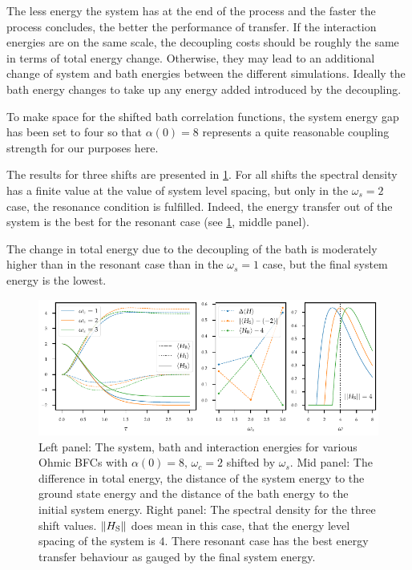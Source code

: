 The less energy the system has at the end of the process and the
faster the process concludes, the better the performance of
transfer. If the interaction energies are on the same scale, the
decoupling costs should be roughly the same in terms of total energy
change. Otherwise, they may lead to an additional change of system and
bath energies between the different simulations. Ideally the bath
energy changes to take up any energy added introduced by the
decoupling.

To make space for the shifted bath correlation functions, the system
energy gap has been set to four so that \(α(0)=8\) represents a quite
reasonable coupling strength for our purposes here.

The results for three shifts are presented in
\cref{fig:resonance_analysis}. For all shifts the spectral density has
a finite value at the value of system level spacing, but only in the
\(ω_s=2\) case, the resonance condition is fulfilled. Indeed, the
energy transfer out of the system is the best for the resonant case
(see \cref{fig:resonance_analysis}, middle panel).

The change in total energy due to the decoupling of the bath is
moderately higher than in the resonant case than in the \(ω_s=1\)
case, but the final system energy is the lowest. 
\begin{figure}[htp]
  \centering
  \includegraphics{figs/one_bath_syst/resonance_analysis}
  \caption{\label{fig:resonance_analysis} Left
    panel: The system, bath and interaction energies for various Ohmic
    BFCs with \(α(0)=8,\,ω_c=2\) shifted by \(ω_s\). Mid panel: The
    difference in total energy, the distance of the system energy to
    the ground state energy and the distance of the bath energy to the
    initial system energy. Right panel: The spectral density for the
    three shift values. \(\norm{H_{\mathrm{S}}}\) does mean in this case, that
    the energy level spacing of the system is \(4\). There resonant
    case has the best energy transfer behaviour as gauged by the final
    system energy.}
\end{figure}

